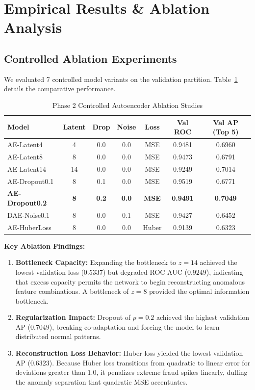 \documentclass[10pt,journal,compsoc]{IEEEtran}
\begin{document}
\section{Empirical Results \& Ablation Analysis}
\subsection{Controlled Ablation Experiments}
We evaluated 7 controlled model variants on the validation partition. Table~\ref{tab:ablations} details the comparative performance.

\begin{table}[htbp]
\caption{Phase 2 Controlled Autoencoder Ablation Studies}
\label{tab:ablations}
\centering
\begin{tabular}{lcccccc}
\toprule
\textbf{Model} & \textbf{Latent} & \textbf{Drop} & \textbf{Noise} & \textbf{Loss} & \textbf{Val ROC} & \textbf{Val AP (Top 5)} \\
\midrule
AE-Latent4       & 4  & 0.0 & 0.0 & MSE   & 0.9481 & 0.6960 \\
AE-Latent8       & 8  & 0.0 & 0.0 & MSE   & 0.9473 & 0.6791 \\
AE-Latent14      & 14 & 0.0 & 0.0 & MSE   & 0.9249 & 0.7014 \\
AE-Dropout0.1    & 8  & 0.1 & 0.0 & MSE   & 0.9519 & 0.6771 \\
\textbf{AE-Dropout0.2} & \textbf{8} & \textbf{0.2} & \textbf{0.0} & \textbf{MSE} & \textbf{0.9491} & \textbf{0.7049} \\
DAE-Noise0.1     & 8  & 0.0 & 0.1 & MSE   & 0.9427 & 0.6452 \\
AE-HuberLoss     & 8  & 0.0 & 0.0 & Huber & 0.9139 & 0.6323 \\
\bottomrule
\end{tabular}
\end{table}

\textbf{Key Ablation Findings:}
\begin{enumerate}
    \item \textbf{Bottleneck Capacity:} Expanding the bottleneck to $z=14$ achieved the lowest validation loss ($0.5337$) but degraded ROC-AUC ($0.9249$), indicating that excess capacity permits the network to begin reconstructing anomalous feature combinations. A bottleneck of $z=8$ provided the optimal information bottleneck.
    \item \textbf{Regularization Impact:} Dropout of $p=0.2$ achieved the highest validation AP ($0.7049$), breaking co-adaptation and forcing the model to learn distributed normal patterns.
    \item \textbf{Reconstruction Loss Behavior:} Huber loss yielded the lowest validation AP ($0.6323$). Because Huber loss transitions from quadratic to linear error for deviations greater than $1.0$, it penalizes extreme fraud spikes linearly, dulling the anomaly separation that quadratic MSE accentuates.
\end{enumerate}
\end{document}
